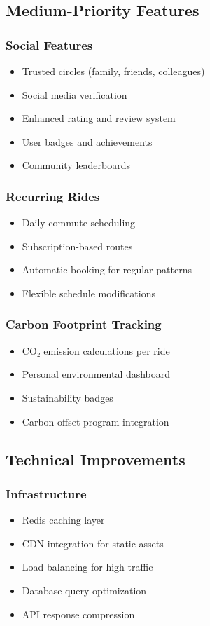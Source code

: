 \documentclass[12pt,a4paper]{article}
\begin{document}
\subsection{Medium-Priority Features}

\subsubsection{Social Features}
\begin{itemize}
    \item Trusted circles (family, friends, colleagues)
    \item Social media verification
    \item Enhanced rating and review system
    \item User badges and achievements
    \item Community leaderboards
\end{itemize}

\subsubsection{Recurring Rides}
\begin{itemize}
    \item Daily commute scheduling
    \item Subscription-based routes
    \item Automatic booking for regular patterns
    \item Flexible schedule modifications
\end{itemize}

\subsubsection{Carbon Footprint Tracking}
\begin{itemize}
    \item CO₂ emission calculations per ride
    \item Personal environmental dashboard
    \item Sustainability badges
    \item Carbon offset program integration
\end{itemize}

\subsection{Technical Improvements}

\subsubsection{Infrastructure}
\begin{itemize}
    \item Redis caching layer
    \item CDN integration for static assets
    \item Load balancing for high traffic
    \item Database query optimization
    \item API response compression
\end{itemize}
\end{document}
